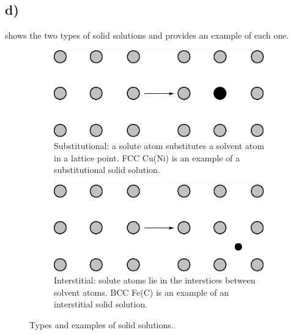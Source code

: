 \documentclass[a4paper]{article}
\begin{document}
	\subsection{d)}
	 shows the two types of solid solutions and provides an example of each one.
	\begin{figure}
		\centering
		\begin{subfigure}[b]{0.45\linewidth}
			\centering
			\includegraphics[width=\linewidth]{subs.eps}
			\caption{Substitutional: a solute atom substitutes a solvent atom in a lattice point. FCC Cu(Ni) is an example of a substitutional solid solution.}
			\label{sf:subs}
		\end{subfigure}
		\qquad\qquad
		\begin{subfigure}[b]{0.45\linewidth}
			\centering
			\includegraphics[width=\linewidth]{inters.eps}
			\caption{Interstitial: solute atoms lie in the interstices between solvent atoms. BCC Fe(C) is an example of an interstitial solid solution.}
			\label{sf:inters}
		\end{subfigure}
		\caption{Types and examples of solid solutions.}
		\label{f:ssol}
	\end{figure}
\end{document}
